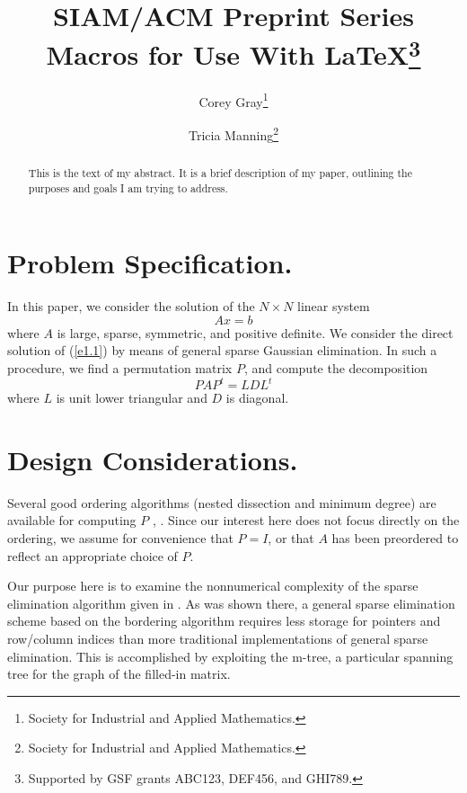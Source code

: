 \documentclass[twoside,leqno,twocolumn]{article}
\begin{document}

\title{\Large SIAM/ACM Preprint Series Macros for
Use With LaTeX\thanks{Supported by GSF grants ABC123, DEF456, and GHI789.}}
\author{Corey Gray\thanks{Society for Industrial and Applied Mathematics.} \\
\and
Tricia Manning\thanks{Society for Industrial and Applied Mathematics.}}
\date{}

\maketitle



\begin{abstract} \small\baselineskip=9pt This is the text of my abstract. It is a brief
description of my
paper, outlining the purposes and goals I am trying to address.\end{abstract}




\section{Problem Specification.}In this paper, we consider the solution of the $N \times
N$ linear
system
\begin{equation} \label{e1.1}
A x = b
\end{equation}
where $A$ is large, sparse, symmetric, and positive definite.  We consider
the direct solution of (\ref{e1.1}) by means of general sparse Gaussian
elimination.  In such a procedure, we find a permutation matrix $P$, and
compute the decomposition
\[
P A P^{t} = L D L^{t}
\]
where $L$ is unit lower triangular and $D$ is diagonal.


\section{Design Considerations.}Several good ordering algorithms (nested dissection and
minimum degree)
are available for computing $P$  \cite{GEORGELIU}, \cite{ROSE72}.
Since our interest here does not
focus directly on the ordering, we assume for convenience that $P=I$,
or that $A$ has been preordered to reflect an appropriate choice of $P$.

Our purpose here is to examine the nonnumerical complexity of the
sparse elimination algorithm given in  \cite{BANKSMITH}.
As was shown there, a general sparse elimination scheme based on the
bordering algorithm requires less storage for pointers and
row/column indices than more traditional implementations of general
sparse elimination.  This is accomplished by exploiting the m-tree,
a particular spanning tree for the graph of the filled-in matrix.
\end{document}
